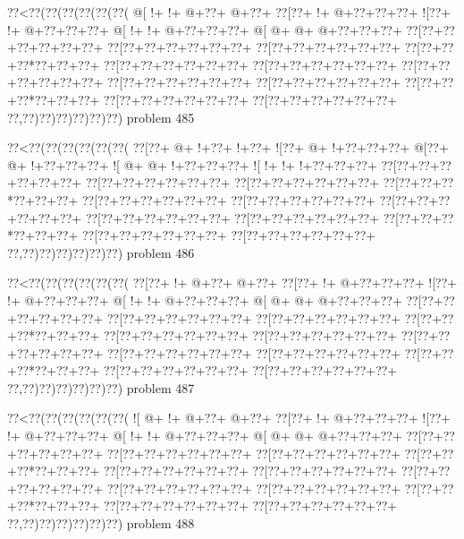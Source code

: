 \vbox{\vbox{\goo
\0??<\0??(\0??(\0??(\0??(\0??(\0??(
\- @[\- !+\- !+\- @+\0??+\- @+\0??+
\0??[\0??+\- !+\- @+\0??+\0??+\0??+
\- ![\0??+\- !+\- @+\0??+\0??+\0??+
\- @[\- !+\- !+\- @+\0??+\0??+\0??+
\- @[\- @+\- @+\- @+\0??+\0??+\0??+
\0??[\0??+\0??+\0??+\0??+\0??+\0??+
\0??[\0??+\0??+\0??+\0??+\0??+\0??+
\0??[\0??+\0??+\0??+\0??+\0??+\0??+
\0??[\0??+\0??+\0??*\0??+\0??+\0??+
\0??[\0??+\0??+\0??+\0??+\0??+\0??+
\0??[\0??+\0??+\0??+\0??+\0??+\0??+
\0??[\0??+\0??+\0??+\0??+\0??+\0??+
\0??[\0??+\0??+\0??+\0??+\0??+\0??+
\0??[\0??+\0??+\0??+\0??+\0??+\0??+
\0??[\0??+\0??+\0??*\0??+\0??+\0??+
\0??[\0??+\0??+\0??+\0??+\0??+\0??+
\0??[\0??+\0??+\0??+\0??+\0??+\0??+
\0??,\0??)\0??)\0??)\0??)\0??)\0??)
}
\hfil problem 485\hfil\break
}

\vbox{\vbox{\goo
\0??<\0??(\0??(\0??(\0??(\0??(\0??(
\0??[\0??+\- @+\- !+\0??+\- !+\0??+
\- ![\0??+\- @+\- !+\0??+\0??+\0??+
\- @[\0??+\- @+\- !+\0??+\0??+\0??+
\- ![\- @+\- @+\- !+\0??+\0??+\0??+
\- ![\- !+\- !+\- !+\0??+\0??+\0??+
\0??[\0??+\0??+\0??+\0??+\0??+\0??+
\0??[\0??+\0??+\0??+\0??+\0??+\0??+
\0??[\0??+\0??+\0??+\0??+\0??+\0??+
\0??[\0??+\0??+\0??*\0??+\0??+\0??+
\0??[\0??+\0??+\0??+\0??+\0??+\0??+
\0??[\0??+\0??+\0??+\0??+\0??+\0??+
\0??[\0??+\0??+\0??+\0??+\0??+\0??+
\0??[\0??+\0??+\0??+\0??+\0??+\0??+
\0??[\0??+\0??+\0??+\0??+\0??+\0??+
\0??[\0??+\0??+\0??*\0??+\0??+\0??+
\0??[\0??+\0??+\0??+\0??+\0??+\0??+
\0??[\0??+\0??+\0??+\0??+\0??+\0??+
\0??,\0??)\0??)\0??)\0??)\0??)\0??)
}
\hfil problem 486\hfil\break
}

\vbox{\vbox{\goo
\0??<\0??(\0??(\0??(\0??(\0??(\0??(
\0??[\0??+\- !+\- @+\0??+\- @+\0??+
\0??[\0??+\- !+\- @+\0??+\0??+\0??+
\- ![\0??+\- !+\- @+\0??+\0??+\0??+
\- @[\- !+\- !+\- @+\0??+\0??+\0??+
\- @[\- @+\- @+\- @+\0??+\0??+\0??+
\0??[\0??+\0??+\0??+\0??+\0??+\0??+
\0??[\0??+\0??+\0??+\0??+\0??+\0??+
\0??[\0??+\0??+\0??+\0??+\0??+\0??+
\0??[\0??+\0??+\0??*\0??+\0??+\0??+
\0??[\0??+\0??+\0??+\0??+\0??+\0??+
\0??[\0??+\0??+\0??+\0??+\0??+\0??+
\0??[\0??+\0??+\0??+\0??+\0??+\0??+
\0??[\0??+\0??+\0??+\0??+\0??+\0??+
\0??[\0??+\0??+\0??+\0??+\0??+\0??+
\0??[\0??+\0??+\0??*\0??+\0??+\0??+
\0??[\0??+\0??+\0??+\0??+\0??+\0??+
\0??[\0??+\0??+\0??+\0??+\0??+\0??+
\0??,\0??)\0??)\0??)\0??)\0??)\0??)
}
\hfil problem 487\hfil\break
}

\vbox{\vbox{\goo
\0??<\0??(\0??(\0??(\0??(\0??(\0??(
\- ![\- @+\- !+\- @+\0??+\- @+\0??+
\0??[\0??+\- !+\- @+\0??+\0??+\0??+
\- ![\0??+\- !+\- @+\0??+\0??+\0??+
\- @[\- !+\- !+\- @+\0??+\0??+\0??+
\- @[\- @+\- @+\- @+\0??+\0??+\0??+
\0??[\0??+\0??+\0??+\0??+\0??+\0??+
\0??[\0??+\0??+\0??+\0??+\0??+\0??+
\0??[\0??+\0??+\0??+\0??+\0??+\0??+
\0??[\0??+\0??+\0??*\0??+\0??+\0??+
\0??[\0??+\0??+\0??+\0??+\0??+\0??+
\0??[\0??+\0??+\0??+\0??+\0??+\0??+
\0??[\0??+\0??+\0??+\0??+\0??+\0??+
\0??[\0??+\0??+\0??+\0??+\0??+\0??+
\0??[\0??+\0??+\0??+\0??+\0??+\0??+
\0??[\0??+\0??+\0??*\0??+\0??+\0??+
\0??[\0??+\0??+\0??+\0??+\0??+\0??+
\0??[\0??+\0??+\0??+\0??+\0??+\0??+
\0??,\0??)\0??)\0??)\0??)\0??)\0??)
}
\hfil problem 488\hfil\break
}

